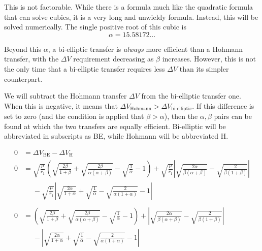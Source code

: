 \documentclass[../main.tex]{subfiles}
\begin{document}
This is not factorable. While there is a formula much like the quadratic formula that can solve cubics, it is a very long and unwieldy formula. Instead, this will be solved numerically. The single positive root of this cubic is
$$\alpha=15.58172\dots$$

Beyond this $\alpha$, a bi-elliptic transfer is \textit{always} more efficient than a Hohmann transfer, with the $\Delta V$ requirement decreasing as $\beta$ increases. However, this is not the only time that a bi-elliptic transfer requires less $\Delta V$ than its simpler counterpart.

We will subtract the Hohmann transfer $\Delta V$ from the bi-elliptic transfer one. When this is negative, it means that $\Delta V_\text{Hohmann}>\Delta V_\text{bi-elliptic}$. If this difference is set to zero (and the condition is applied that $\beta>\alpha$), then the $\alpha,\beta$ pairs can be found at which the two transfers are equally efficient. Bi-elliptic will be abbreviated in subscripts as BE, while Hohmann will be abbreviated H.

\begin{align*}
    0 & =\Delta V_\text{BE}-\Delta V _\text{H}                                                                                                                                                                                                               \\
    0 & =\sqrt{\frac{\mu}{r_1}}\left(\sqrt{\frac{2\beta}{1+\beta}}+\sqrt{\frac{2\beta}{\alpha(\alpha+\beta)}}-\sqrt{\frac{1}{\alpha}}-1\right)+\sqrt{\frac{\mu}{r_1}}\left|\sqrt{\frac{2\alpha}{\beta(\alpha+\beta)}}-\sqrt{\frac{2}{\beta(1+\beta)}}\right| \\
      & \phantom{=}-\sqrt{\frac{\mu}{r_1}}\left|\sqrt{\frac{2\alpha}{1+\alpha}}+\sqrt{\frac{1}{\alpha}}-\sqrt{\frac{2}{\alpha(1+\alpha)}}-1\right|                                                                                                           \\\\
    0 & =\left(\sqrt{\frac{2\beta}{1+\beta}}+\sqrt{\frac{2\beta}{\alpha(\alpha+\beta)}}-\sqrt{\frac{1}{\alpha}}-1\right)+\left|\sqrt{\frac{2\alpha}{\beta(\alpha+\beta)}}-\sqrt{\frac{2}{\beta(1+\beta)}}\right|                                             \\
      & \phantom{=}-\left|\sqrt{\frac{2\alpha}{1+\alpha}}+\sqrt{\frac{1}{\alpha}}-\sqrt{\frac{2}{\alpha(1+\alpha)}}-1\right|                                                                                                                                 \\
\end{align*}
\end{document}
